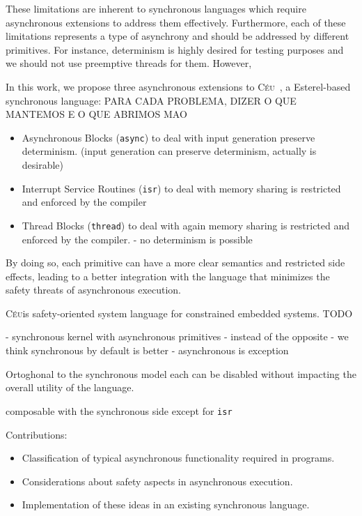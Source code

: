 \documentclass[11pt,a4paper]{article}
\newcommand{\CEU}{\textsc{C\'{e}u}}
\newcommand{\code}[1] {{\small{\texttt{#1}}}}
\begin{document}
These limitations are inherent to synchronous languages which require 
asynchronous extensions to address them effectively.
%
Furthermore, each of these limitations represents a type of asynchrony and 
should be addressed by different primitives.
%
For instance, determinism is highly desired for testing purposes and we should 
not use preemptive threads for them.
%
However,

In this work, we propose three asynchronous extensions to \CEU~\cite{TODO}, a 
Esterel-based synchronous language:
%
PARA CADA PROBLEMA, DIZER O QUE MANTEMOS E O QUE ABRIMOS MAO
\begin{itemize}
\item Asynchronous Blocks (\code{async}) to deal with input generation
preserve determinism.
(input generation can preserve determinism, actually is desirable)
\item Interrupt Service Routines (\code{isr}) to deal with
memory sharing is restricted and enforced by the compiler
\item Thread Blocks (\code{thread}) to deal with
again memory sharing is restricted and enforced by the compiler.
- no determinism is possible
\end{itemize}

%
By doing so, each primitive can have a more clear semantics and restricted side 
effects, leading to a better integration with the language that minimizes the 
safety threats of asynchronous execution.
%

\CEU is safety-oriented system language for constrained embedded systems.
TODO

- synchronous kernel with asynchronous primitives
    - instead of the opposite
    - we think synchronous by default is better
    - asynchronous is exception

Ortoghonal to the synchronous model
each can be disabled without impacting the overall utility of the language.

composable with the synchronous side
except for \code{isr}

Contributions:
\begin{itemize}
\item Classification of typical asynchronous functionality required in 
programs.
\item Considerations about safety aspects in asynchronous execution.
\item Implementation of these ideas in an existing synchronous language.
\end{itemize}
\end{document}

